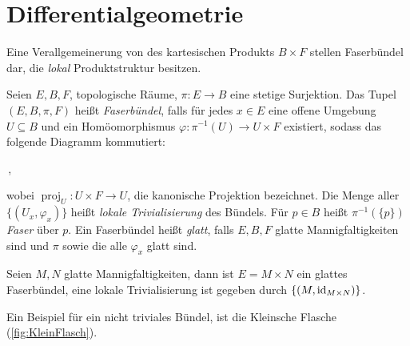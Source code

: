 \section{Differentialgeometrie}
Eine Verallgemeinerung von des kartesischen Produkts $B\times F$ stellen
Faserbündel dar, die \emph{lokal} Produktstruktur besitzen. 
\begin{definition}[Faserbündel]
Seien $E,B,F$, topologische Räume, $\pi:E\to B$ eine stetige Surjektion.
Das Tupel $(E,B,\pi,F)$ heißt \emph{Faserbündel},
falls für jedes $x\in E$ eine offene Umgebung $U\subseteq B$ und ein
Homöomorphismus $\varphi:\pi^{-1}(U)\to U\times F$ existiert, sodass das folgende Diagramm kommutiert:
\begin{center}
\,,
\end{center}
wobei $\operatorname{proj}_U:U\times F \to U$, die kanonische Projektion
bezeichnet. Die Menge aller $\{(U_x,\varphi_x)\}$ heißt \emph{lokale
Trivialisierung} des Bündels. Für $p\in B$ heißt $\pi^{-1}(\{p\})$
\emph{Faser} über $p$.  
Ein Faserbündel heißt \emph{glatt},
falls $E,B,F$ glatte Mannigfaltigkeiten sind und $\pi$ sowie die alle $\varphi_x$
glatt sind.
\end{definition}
\begin{beispiel}
Seien $M,N$ glatte Mannigfaltigkeiten, dann ist $E=M\times N$ ein glattes
Faserbündel, eine lokale Trivialisierung
ist gegeben durch $\{(M,\operatorname{id}_{M\times N})\}$.
\end{beispiel}
Ein Beispiel für ein nicht triviales Bündel, ist die Kleinsche Flasche
(\autoref{fig:KleinFlasch}). 
